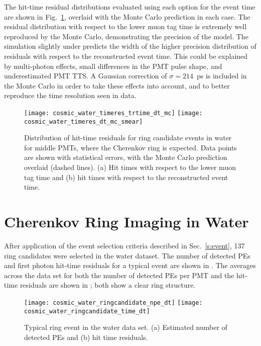 The hit-time residual distributions evaluated using each option for the event time are shown in Fig.~\ref{f:smear}, 
overlaid with the Monte Carlo prediction in each case.  
The residual distribution with respect to the lower muon tag time is extremely well reproduced by the Monte Carlo, demonstrating the precision of the model.  The simulation slightly under predicts the width of the higher precision distribution of residuals with respect to the reconstructed event time.  This could be explained by multi-photon effects, small differences in the PMT pulse shape, and underestimated PMT TTS.  
A Gaussian correction of $\sigma=214$~ps is included in the Monte Carlo in order to take these effects into account, and to better reproduce the time resolution seen in data. 

\begin{figure}
	\centering
	\texttt{[image: cosmic\_water\_timeres\_trtime\_dt\_mc]}
	\texttt{[image: cosmic\_water\_timeres\_dt\_mc\_smear]}
	\caption{Distribution of hit-time residuals 
	for ring candidate events in water for middle PMTs, where the Cherenkov ring is expected. Data points are shown with statistical errors, with the Monte Carlo prediction overlaid (dashed lines). 
	(a) Hit times with respect to the lower muon tag time and (b) hit times with respect to the reconstructed event time.}
	\label{f:smear}
\end{figure}

\section{Cherenkov Ring Imaging in Water}

\label{sec:water}

After application of the event selection criteria described in Sec.~\ref{s:event}, 137 ring candidates were selected in the water dataset.  The number of detected PEs and first photon hit-time residuals for a typical event are shown in . The averages across the data set for both the number of detected PEs per PMT and the hit-time residuals are shown in ; both show a clear ring structure. 


\begin{figure}
	\centering
	\texttt{[image: cosmic\_water\_ringcandidate\_npe\_dt]}
	\texttt{[image: cosmic\_water\_ringcandidate\_time\_dt]}
	\caption{Typical ring event in the water data set. (a) Estimated number of detected PEs and (b) hit time residuals.}
	\label{fig:cosmics_water_ring_candidate}
\end{figure}


